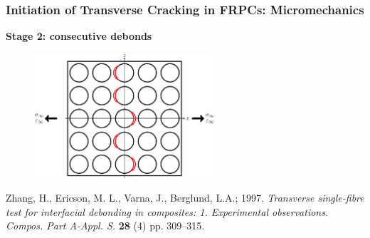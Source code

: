 \documentclass[first,firstsupp,lastsupp,last,hyperref,table]{ETHclass}
\begin{document}
\begin{frame}
\frametitle{\vspace{0.2cm}\small Initiation of Transverse Cracking in FRPCs: Micromechanics}
\vspace{-0.75cm}
\centering
\begin{alertblock}{\centering\scriptsize\bf Stage 2: consecutive debonds}
\begin{figure}
\centering
\includegraphics[width=0.6\textwidth]{stage2-critdebonds.pdf}
\end{figure}
\end{alertblock}
\vspace{-0.5cm}
{\tiny Zhang, H., Ericson, M. L., Varna, J., Berglund, L.A.; 1997. {\em\tiny Transverse single-fibre test for interfacial debonding in composites: 1. Experimental observations}. {\it\tiny Compos. Part A-Appl. S.} {\bf\tiny 28} (4) pp. 309--315.}
\end{frame}
\end{document}
